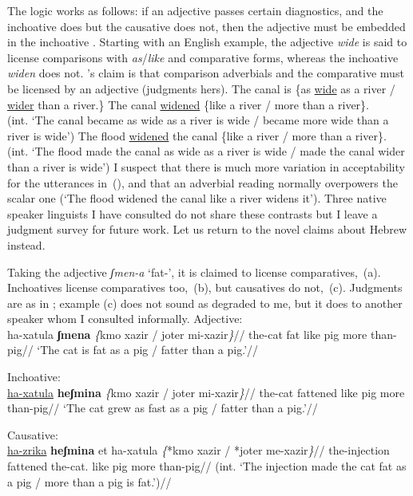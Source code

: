 The logic works as follows: if an adjective passes certain diagnostics, and the inchoative does but the causative does not, then the adjective must be embedded in the inchoative \citep[130]{borer91}. Starting with an English example, the adjective \emph{wide} is said to license comparisons with \emph{as}/\emph{like} and comparative forms, whereas the inchoative \emph{widen} does not. \citeauthor{borer91}'s claim is that comparison adverbials and the comparative must be licensed by an adjective (judgments hers).
\pex
  \a The canal is \{as \underline{wide} as a river / \underline{wider} than a river.\}
  \a The canal \underline{widened} \{like a river / more than a river\}.\\
	  (int. `The canal became as wide as a river is wide / became more wide than a river is wide')
  \a \ljudge{*} The flood \underline{widened} the canal \{like a river / more than a river\}.\\
	  (int. `The flood made the canal as wide as a river is wide / made the canal wider than a river is wide')
\xe
I suspect that there is much more variation in acceptability for the utterances in~(\lastx), and that an adverbial reading normally overpowers the scalar one (`The flood widened the canal like a river widens it'){. Three native speaker linguists I have consulted do not share these contrasts} but I leave a judgment survey for future work. Let us return to the novel claims about Hebrew instead.

Taking the adjective \emph{ʃmen-a} `fat-', it is claimed to license comparatives,~(\nextx a). Inchoatives license comparatives too,~(\nextx b), but causatives do not,~(\nextx c). Judgments are as in \cite{borer91}{; example} (\nextx c) {does not sound as degraded to me, but it does to another speaker whom I consulted informally.}
\pex
  \a Adjective:\\ \begingl
    \gla ha-xatula \textbf{ʃmena} \emph{\{}kmo xazir / joter mi-xazir\emph{\}}//
    \glb the-cat fat like pig {} more than-pig//
    \glft `The cat is fat as a pig / fatter than a pig.'//
  \endgl
  
  \a Inchoative:\\ \begingl
    \gla \underline{ha-xatula} \textbf{heʃmina} \emph{\{}kmo xazir / joter mi-xazir\emph{\}}//
    \glb the-cat fattened like pig {} more than-pig//
    \glft `The cat grew as fast as a pig / fatter than a pig.'//
  \endgl

  \a Causative:\\ \begingl
    \gla \ljudge{*}\underline{ha-zrika} \textbf{heʃmina} et ha-xatula \emph{\{}*kmo xazir / *joter me-xazir\emph{\}}//
    \glb the-injection fattened  the-cat. like pig {} more than-pig//
    \glft (int. `The injection made the cat fat as a pig / more than a pig is fat.')//
  \endgl
\xe

